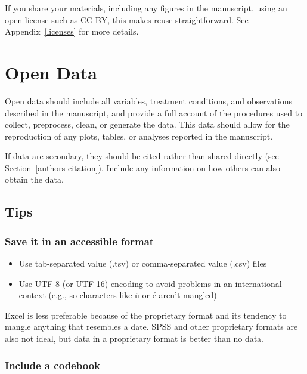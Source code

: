 \documentclass[
  oneside]{book}
\providecommand{\tightlist}{%
  \setlength{\itemsep}{0pt}\setlength{\parskip}{0pt}}
\begin{document}
If you share your materials, including any figures in the manuscript, using an open license such as CC-BY, this makes reuse straightforward. See Appendix~\ref{licenses} for more details.

\hypertarget{authors-open-data}{%
\chapter{Open Data}\label{authors-open-data}}

Open data should include all variables, treatment conditions, and observations described in the manuscript, and provide a full account of the procedures used to collect, preprocess, clean, or generate the data. This data should allow for the reproduction of any plots, tables, or analyses reported in the manuscript.

If data are secondary, they should be cited rather than shared directly (see Section~\ref{authors-citation}). Include any information on how others can also obtain the data.

\hypertarget{authors-data-tips}{%
\section{Tips}\label{authors-data-tips}}

\hypertarget{save-it-in-an-accessible-format}{%
\subsection{Save it in an accessible format}\label{save-it-in-an-accessible-format}}

\begin{itemize}
\tightlist
\item
  Use tab-separated value (.tsv) or comma-separated value (.csv) files
\item
  Use UTF-8 (or UTF-16) encoding to avoid problems in an international context (e.g., so characters like ü or é aren't mangled)
\end{itemize}

Excel is less preferable because of the proprietary format and its tendency to mangle anything that resembles a date. SPSS and other proprietary formats are also not ideal, but data in a proprietary format is better than no data.

\hypertarget{include-a-codebook}{%
\subsection{Include a codebook}\label{include-a-codebook}}
\end{document}
